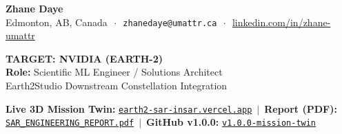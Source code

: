 \documentclass[10pt,letterpaper]{article}
\begin{document}
\begin{tcolorbox}[colframe=nvidiadark,colback=nvidiadark,coltext=white,boxrule=0pt,top=6pt,bottom=6pt]
\begin{minipage}[c]{0.58\textwidth}
    {\Large\textbf{Zhane Daye}} \\[2pt]
    {\footnotesize Edmonton, AB, Canada $\,\cdot\,$ \texttt{zhanedaye@umattr.ca} $\,\cdot\,$ \href{https://www.linkedin.com/in/zhane-umattr}{linkedin.com/in/zhane-umattr}}
\end{minipage}
\hfill
\begin{minipage}[c]{0.40\textwidth}
    \raggedleft
    {\large\textbf{TARGET: NVIDIA (EARTH-2)}}\\[1pt]
    {\footnotesize\textbf{Role:} Scientific ML Engineer / Solutions Architect}\\[1pt]
    {\scriptsize Earth2Studio Downstream Constellation Integration}
\end{minipage}
\end{tcolorbox}

\vspace{-4pt}

\begin{tcolorbox}[colframe=bordergray,colback=lightbg,top=3pt,bottom=3pt]
\footnotesize
\textbf{Live 3D Mission Twin:} \href{https://earth2-sar-insar.vercel.app}{\texttt{earth2-sar-insar.vercel.app}} $\,\vert\,$ 
\textbf{Report (PDF):} \href{https://earth2-sar-insar.vercel.app/reports/EARTH2_X_BAND_SAR_INSAR_ENGINEERING_REPORT.pdf}{\texttt{SAR\_ENGINEERING\_REPORT.pdf}} $\,\vert\,$ 
\textbf{GitHub v1.0.0:} \href{https://github.com/zrt219/earth2studio/releases/tag/v1.0.0-mission-twin}{\texttt{v1.0.0-mission-twin}}
\end{tcolorbox}

\vspace{-4pt}
\end{document}
